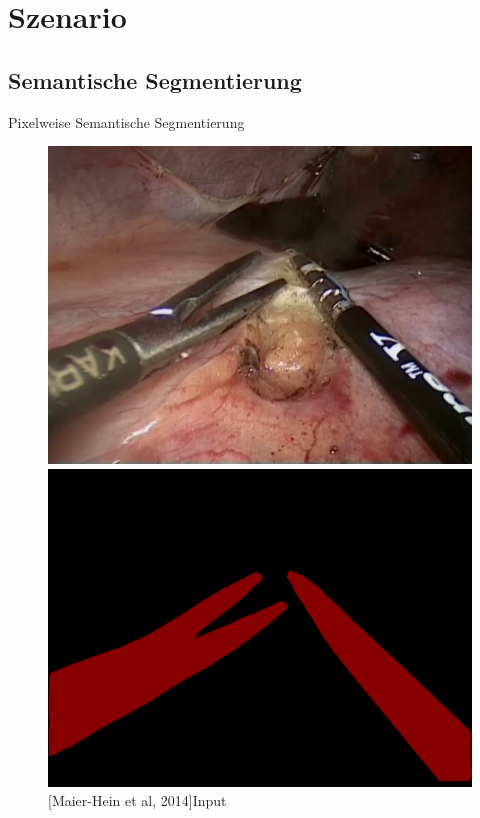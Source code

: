 
\section{Szenario}
\subsection{Semantische Segmentierung}
\begin{frame}{Pixelweise Semantische Segmentierung}
    \begin{figure}[ht]
        \begin{minipage}[b]{0.45\linewidth}
            \centering
            \includegraphics[width=\textwidth]{../images/img_35_raw.png}
            \caption{[Maier-Hein et al, 2014]\hspace{\textwidth}Input}
            \label{fig:input}
        \end{minipage}
        \hspace{0.5cm}
        \begin{minipage}[b]{0.45\linewidth}
            \centering
            \includegraphics[width=\textwidth]{../images/img_35_label.png}

\end{minipage}
\end{figure}
\end{frame}
